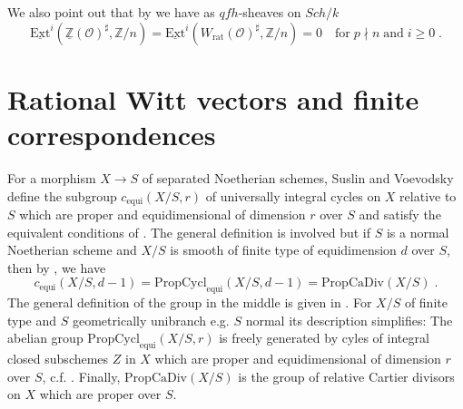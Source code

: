 \documentclass[12pt,leqno]{article}
\newcommand{\Z}{{\mathbb{Z}}}
\newcommand{\uZ}{\underline{\Z}}
\newcommand{\equi}{\mathrm{equi}}
\newcommand{\Ext}{\mathrm{Ext}}
\newcommand{\uExt}{\underline{\Ext}}
\newcommand{\PropCycl}{\mathrm{PropCycl}}
\newcommand{\PropCaDir}{\mathrm{PropCaDiv}}
\newcommand{\rat}{\mathrm{rat}}
\newcommand{\Oh}{{\mathcal O}}
\begin{document}
We also point out that by \cite[Lemma 7.2]{SV1} we have as $qfh$-sheaves on $Sch/ k$ 
\[
\uExt^i (\uZ (\Oh)^{\sharp} , \Z / n) = \uExt^i (W_{\rat} (\Oh)^{\sharp} , \Z / n) = 0 \quad \text{for} \; p \nmid n \; \text{and} \; i \ge 0 \; .
\]
%
\section{Rational Witt vectors and finite correspondences} \label{sec:5}

For a morphism $X \to S$ of separated Noetherian schemes, Suslin and Voevodsky define the subgroup $c_{\equi} (X / S , r)$ of universally integral cycles on $X$ relative to $S$ which are proper and equidimensional of dimension $r$ over $S$ and satisfy the equivalent conditions of \cite[Lemma 3.3.9]{SV2}. The general definition is involved but if $S$ is a normal Noetherian scheme and $X / S$ is smooth of finite type of equidimension $d$ over $S$, then by \cite[Proposition 3.4.8]{SV2}, we have
\begin{equation}
\label{eq:22}
c_{\equi} (X / S , d-1) = \PropCycl_{\equi} (X / S , d-1) = \PropCaDir (X / S) \; .
\end{equation}
The general definition of the group in the middle is given in \cite[Definition 3.1.3]{SV2}. For $X / S$ of finite type and $S$ geometrically unibranch e.g. $S$ normal its description simplifies: The abelian group $\PropCycl_{\equi} (X / S , r)$ is freely generated by cyles of integral closed subschemes $Z$ in $X$ which are proper and equidimensional of dimension $r$ over $S$, c.f. \cite[Corollary 3.4.3]{SV2}. Finally, $\PropCaDir (X/S)$ is the group of relative Cartier divisors on $X$ which are proper over $S$.
\end{document}

